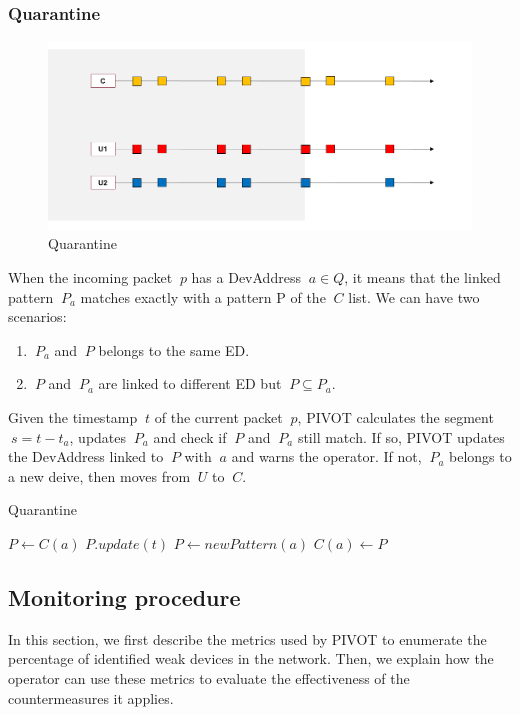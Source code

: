 \subsubsection{Quarantine}
\begin{figure}[t]
    \centering
    \includegraphics[width=0.7\linewidth]{images/pivot/quarantine.PNG}
    \caption{Quarantine}
    \label{fig:quarantine}
\end{figure}
When the incoming packet \(\ p \) has a DevAddress \(\ a \in Q \), it means that the linked pattern \(\ P_{a} \) matches exactly with a pattern P of the \(\ C \) list. We can have two scenarios:
\begin{enumerate}
	\item \(\ P_{a} \) and \(\ P \) belongs to the same ED.
	\item  \(\ P \) and \(\ P_{a} \) are linked to different ED but \(\ P \subseteq P_{a} \).
\end{enumerate}
Given the timestamp \(\ t \) of the current packet \(\ p \), PIVOT calculates the segment \(\ s = t - t_{a} \), updates \(\ P_{a} \) and check if \(\ P \) and \(\ P_{a} \) still match. If so, PIVOT updates the DevAddress linked to \(\ P \) with \(\ a \) and warns the operator. If not, \(\ P_{a} \) belongs to a new deive, then moves from \(\ U \) to \(\ C \).
\begin{algorithm}[h!]
    \caption{Quarantine}
    \begin{algorithmic}[1]
            \State $P \gets C(a)$
            \State $P.update(t)$
        \Else
            \State $P \gets newPattern(a)$
            \State $C(a) \gets P$
        \EndIf
    \end{algorithmic}
\end{algorithm}

\subsection{Monitoring procedure}
In this section, we first describe the metrics used by PIVOT to enumerate the percentage of identified weak devices in the network. Then, we explain how the operator can use these metrics to evaluate the effectiveness of the countermeasures it applies.